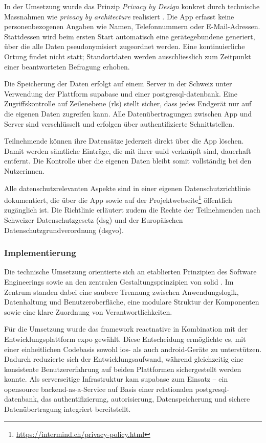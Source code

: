 In der Umsetzung wurde das Prinzip \textit{Privacy by Design} konkret durch technische Massnahmen wie \textit{privacy by architecture} realisiert \parencite{spiekermannEngineeringPrivacy2009}. Die App erfasst keine personenbezogenen Angaben wie Namen, Telefonnummern oder E-Mail-Adressen. Stattdessen wird beim ersten Start automatisch eine gerätegebundene  generiert, über die alle Daten pseudonymisiert zugeordnet werden. Eine kontinuierliche Ortung findet nicht statt; Standortdaten werden ausschliesslich zum Zeitpunkt einer beantworteten Befragung erhoben.


Die Speicherung der Daten erfolgt auf einem Server in der Schweiz unter Verwendung der Plattform \gls{supabase} und einer \gls{postgresql}-\gls{datenbank}. Eine Zugriffskontrolle auf Zeilenebene (\gls{rls}) stellt sicher, dass jedes Endgerät nur auf die eigenen Daten zugreifen kann. Alle Datenübertragungen zwischen App und Server sind verschlüsselt und erfolgen über authentifizierte Schnittstellen.

Teilnehmende können ihre Datensätze jederzeit direkt über die App löschen. Damit werden sämtliche Einträge, die mit ihrer \gls{uuid} verknüpft sind, dauerhaft entfernt. Die Kontrolle über die eigenen Daten bleibt somit vollständig bei den Nutzer\genderstern innen.

Alle datenschutzrelevanten Aspekte sind in einer eigenen Datenschutzrichtlinie dokumentiert, die über die App sowie auf der Projektwebseite\footnote{\href{https://intermind.ch/privacy-policy.html}{https://intermind.ch/privacy-policy.html}} öffentlich zugänglich ist. Die Richtlinie erläutert zudem die Rechte der Teilnehmenden nach Schweizer Datenschutzgesetz (\gls{dsg}) und der Europäischen Datenschutzgrundverordnung (\gls{dsgvo}).


\subsubsection{Implementierung}

Die technische Umsetzung orientierte sich an etablierten Prinzipien des Software Engineerings \parencite{sommervilleSoftwareEngineering2016} sowie an den zentralen Gestaltungsprinzipien von \gls{solid} \parencite{martinAgileSoftwareDevelopment2002}. Im Zentrum standen dabei eine saubere Trennung zwischen Anwendungslogik, Datenhaltung und Benutzeroberfläche, eine modulare Struktur der Komponenten sowie eine klare Zuordnung von Verantwortlichkeiten.

Für die Umsetzung wurde das \gls{framework} \gls{reactnative} in Kombination mit der Entwicklungsplattform \gls{expo} gewählt. Diese Entscheidung ermöglichte es, mit einer einheitlichen Codebasis sowohl \gls{ios}- als auch \gls{android}-Geräte zu unterstützen. Dadurch reduzierte sich der Entwicklungsaufwand, während gleichzeitig eine konsistente Benutzererfahrung auf beiden Plattformen sichergestellt werden konnte. Als serverseitige Infrastruktur kam \gls{supabase} zum Einsatz – ein \gls{opensource} \gls{backend}-as-a-Service auf Basis einer relationalen \gls{postgresql}-\gls{datenbank}, das \gls{authentifizierung}, \gls{autorisierung}, Datenspeicherung und sichere Datenübertragung integriert bereitstellt.

